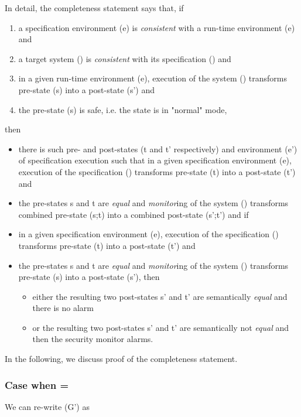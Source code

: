 \documentclass[conference]{IEEEtran}
\begin{document}
In detail, the completeness statement says that, if
\begin{enumerate}
\item a specification environment (e) is \emph{consistent} with a run-time environment (e) and
\item a target system () is \emph{consistent} with its specification () and
\item in a given run-time environment (e), execution of the system () transforms pre-state (s) into a post-state (s') and
\item the pre-state (s) is safe, i.e. the state is in "normal" mode,
\end{enumerate}
then 
\begin{itemize}
\item there is such pre- and post-states (t and t' respectively) and environment (e') of specification execution such that in a given specification environment (e), execution of the specification () transforms pre-state (t) into a post-state (t') and
\item the pre-states s and t are \emph{equal} and \emph{monitor}ing of the system () transforms combined pre-state (s;t) into a combined post-state (s';t') and if
\item in a given specification environment (e), execution of the specification () transforms pre-state (t) into a post-state (t') and
\item the pre-states s and t are \emph{equal} and \emph{monitor}ing of the system () transforms pre-state (s) into a post-state (s'), then
\begin{itemize}
\item either the resulting two post-states s' and t' are semantically \emph{equal} and there is no alarm
\item or the resulting two post-states s' and t' are semantically not \emph{equal} and then the security monitor alarms.
\end{itemize}
\end{itemize}

In the following, we discuss proof of the completeness statement.

\subsubsection{Case when  = }

We can re-write (G') as
\end{document}
